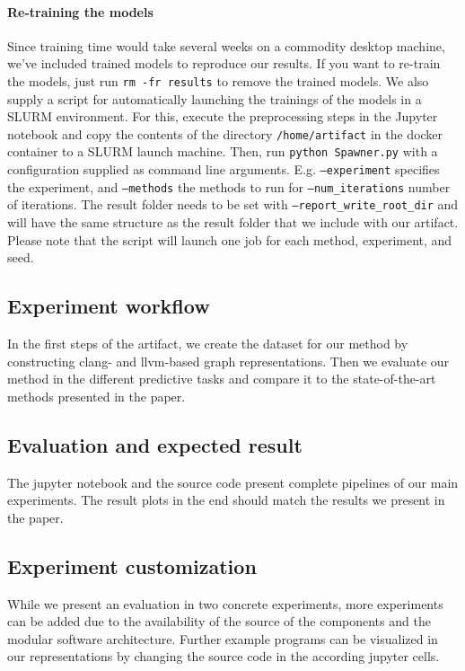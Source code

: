 \paragraph{Re-training the models}
Since training time would take several weeks on a commodity desktop machine, we've included trained models to reproduce our results. If you want to re-train the models, just run \texttt{rm -fr results} to remove the trained models.
We also supply a script for automatically launching the trainings of the models in a SLURM environment. For this, execute the preprocessing steps in the Jupyter notebook and copy the contents of the directory \texttt{/home/artifact} in the docker container to a SLURM launch machine. Then, run \texttt{python Spawner.py} with a configuration supplied as command line arguments. E.g. \texttt{--experiment} specifies the experiment, and \texttt{--methods} the methods to run for \texttt{--num\_iterations} number of iterations. The result folder needs to be set with \texttt{--report\_write\_root\_dir} and will have the same structure as the result folder that we include with our artifact.
Please note that the script will launch one job for each method, experiment, and seed.

\subsection{Experiment workflow}
In the first steps of the artifact, we create the dataset for our method by constructing clang- and llvm-based graph representations.
Then we evaluate our method in the different predictive tasks and compare it to the state-of-the-art methods presented in the paper.

\subsection{Evaluation and expected result}
The jupyter notebook and the source code present complete pipelines of our main experiments. The result plots in the end should match the results we present in the paper.

\subsection{Experiment customization}
While we present an evaluation in two concrete experiments, more experiments can be added due to the availability of the source of the components and the modular software architecture.
Further example programs can be visualized in our representations by changing the source code in the according jupyter cells.

